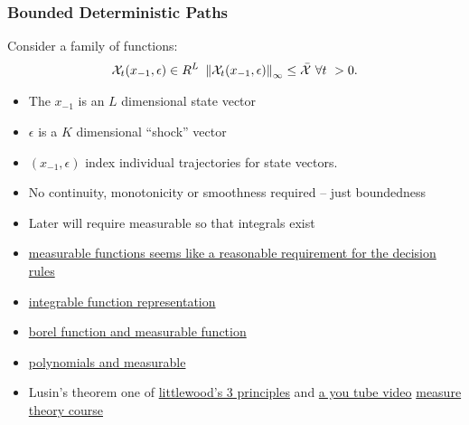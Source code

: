 \documentclass[tikz]{beamer}
\begin{document}
\begin{frame}
  \frametitle{Bounded Deterministic Paths}

Consider a family of functions:
 \begin{gather}
   \mathcal{X}_{t}(x_{-1},\epsilon) \in{R^L}\,\,\left\lVert\mathcal{X}_{t}(x_{-1},\epsilon)\right\rVert_\infty  \le \bar{\mathcal{X}}\,\,\forall t\ > 0 \label{fFamily}.
 \end{gather}
 \begin{itemize}
 \item The $x_{-1}$ is an  $L$ dimensional state vector
 \item $\epsilon$ is a $K$ dimensional ``shock'' vector
 \item  $(x_{-1},\epsilon)$ index individual trajectories for  state vectors.  
 \item No continuity, monotonicity or smoothness required  -- just boundedness
 \item Later will require measurable so that integrals exist
  \item \href{http://math.stackexchange.com/questions/176379/approximation-of-bounded-measurable-functions-with-continuous-functions}{measurable functions seems like a reasonable requirement for the decision rules}
  \item \href{http://math.stackexchange.com/questions/76931/finding-simple-step-and-continuous-functions-to-satisfy-lebesgue-integral-cond}{integrable function representation}
  \item \href{http://math.stackexchange.com/questions/434239/measurable-function-approximated-by-borel-function}{borel function and measurable function}
  \item \href{http://math.stackexchange.com/questions/573158/approximate-a-complex-measurable-function-pointwisely-almost-everywhere-by-polyn}{polynomials and measurable}
  \item Lusin's theorem one of \href{https://faculty.etsu.edu/gardnerr/5210/notes/3-3.pdf}{littlewood's 3 principles}   and \href{https://www.youtube.com/watch?v=-jOcbJpWttc}{a you tube video}  \href{http://web.maths.unsw.edu.au/~potapov/5825_2013/}{measure theory course }
 \end{itemize}

\end{frame}
\end{document}
